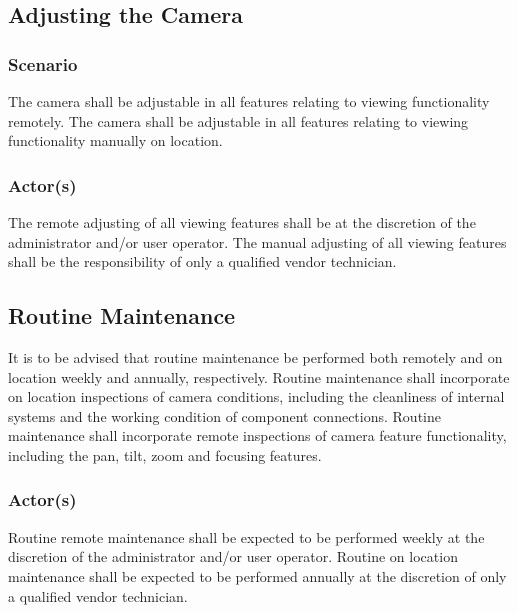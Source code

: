 \subsection{Adjusting the Camera}
\subsubsection{Scenario}
The camera shall be adjustable in all features relating to viewing functionality remotely.
The camera shall be adjustable in all features relating to viewing functionality manually on location.
\subsubsection{Actor(s)}
The remote adjusting of all viewing features shall be at the discretion of the administrator and/or user operator.
The manual adjusting of all viewing features shall be the responsibility of only a qualified vendor technician.
\subsection{Routine Maintenance}
It is to be advised that routine maintenance be performed both remotely and on location weekly and annually, respectively.
Routine maintenance shall incorporate on location inspections of camera conditions, including the cleanliness of internal systems and the working condition of component connections.
Routine maintenance shall incorporate remote inspections of camera feature functionality, including the pan, tilt, zoom and focusing features.
\subsubsection{Actor(s)}
Routine remote maintenance shall be expected to be performed weekly at the discretion of the administrator and/or user operator.
Routine on location maintenance shall be expected to be performed annually at the discretion of only a qualified vendor technician.
